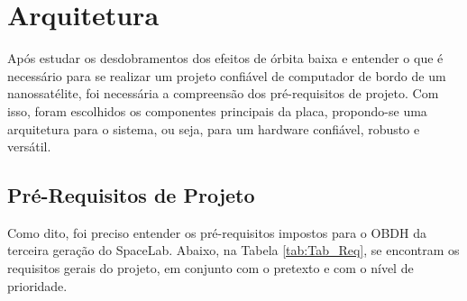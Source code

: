 \chapter{Arquitetura}

Após estudar os desdobramentos dos efeitos de órbita baixa e entender o que é necessário para se realizar um projeto confiável de computador de bordo de um nanossatélite, foi necessária a compreensão dos pré-requisitos de projeto. Com isso, foram escolhidos os componentes principais da placa, propondo-se uma arquitetura para o sistema, ou seja, para um hardware confiável, robusto e versátil.  

\section{Pré-Requisitos de Projeto}

Como dito, foi preciso entender os pré-requisitos impostos para o OBDH da terceira geração do SpaceLab. Abaixo, na Tabela \ref{tab:Tab_Req}, se encontram os requisitos gerais do projeto, em conjunto com o pretexto e com o nível de prioridade.

